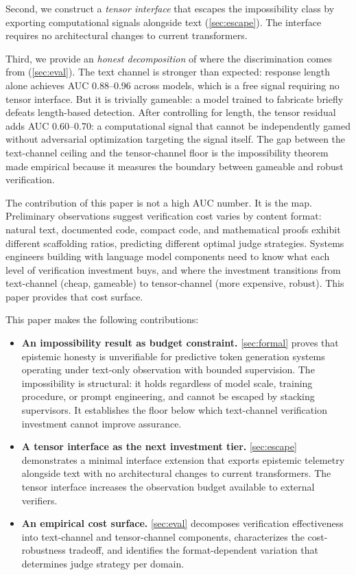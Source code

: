 Second, we construct a \emph{tensor interface} that escapes the impossibility
class by exporting computational signals alongside text
(\autoref{sec:escape}). The interface requires no architectural changes to
current transformers.

Third, we provide an \emph{honest decomposition} of where the discrimination
comes from (\autoref{sec:eval}). The text channel is stronger than
expected: response length alone achieves AUC 0.88--0.96 across models, which is a
free signal requiring no tensor interface. But it is trivially gameable: a
model trained to fabricate briefly defeats length-based detection. After
controlling for length, the tensor residual adds AUC 0.60--0.70: a
computational signal that cannot be independently gamed without adversarial
optimization targeting the signal itself. The gap between the text-channel
ceiling and the tensor-channel floor is the impossibility theorem made
empirical because it measures the boundary between gameable and robust verification.

The contribution of this paper is not a high AUC number. It is the map.
Preliminary observations suggest verification cost varies by content format:
natural text, documented code, compact code, and mathematical proofs exhibit
different scaffolding ratios, predicting different optimal judge strategies.
Systems engineers building with language model components need to know what
each level of verification investment buys, and where the investment
transitions from text-channel (cheap, gameable) to tensor-channel (more
expensive, robust). This paper provides that cost surface.

This paper makes the following contributions:

\begin{itemize}
\item \textbf{An impossibility result as budget constraint.}
  \autoref{sec:formal} proves that
  epistemic honesty is unverifiable for predictive token generation
  systems operating under text-only observation with bounded
  supervision. The impossibility is structural: it holds regardless
  of model scale, training procedure, or prompt engineering, and
  cannot be escaped by stacking supervisors. It establishes the
  floor below which text-channel verification investment cannot improve
  assurance.

\item \textbf{A tensor interface as the next investment tier.}
  \autoref{sec:escape} demonstrates a minimal interface extension that exports
  epistemic telemetry alongside text with no architectural changes to
  current transformers. The tensor interface increases the observation
  budget available to external verifiers.

\item \textbf{An empirical cost surface.}
  \autoref{sec:eval} decomposes verification effectiveness into
  text-channel and tensor-channel components, characterizes the
  cost-robustness tradeoff, and identifies the format-dependent
  variation that determines judge strategy per domain.
\end{itemize}
